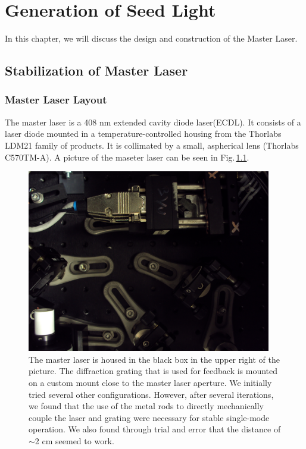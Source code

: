 \chapter{Generation of Seed Light}\label{generationOfSeedLight}

In this chapter, we will discuss the design and construction of the Master Laser. 

\section{Stabilization of Master Laser}
\subsection{Master Laser Layout}
The master laser is a 408 nm extended cavity diode laser(ECDL). It consists of a laser diode mounted in a temperature-controlled housing from the Thorlabs LDM21 family of products. It is collimated by a small, aspherical lens (Thorlabs C570TM-A). A picture of the maseter laser can be seen in Fig.\,\ref{master_laser_photo}.

\begin{figure}
\centerline{
\includegraphics[width=0.95\textwidth]{master_laser.JPG}}
\caption[Photograph of Master Laser]{\label{master_laser_photo} The master laser is housed in the black box in the upper right of the picture. The diffraction grating that is used for feedback is mounted on a custom mount close to the master laser aperture. We initially tried several other configurations. However, after several iterations, we found that the use of the metal rods to directly mechanically couple the laser and grating were necessary for stable single-mode operation. We also found through trial and error that the distance of $\sim$2 cm seemed to work. }
\end{figure}


